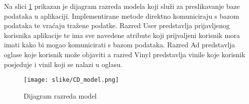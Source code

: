 			\eject
				
			Na slici \ref{fig:model} prikazan je dijagram razreda modela koji služi za preslikavanje baze podataka u aplikaciji. Implementirane metode direktno komuniciraju s bazom podataka te vraćaju tražene podatke. Razred User predstavlja prijavljenog korisnika aplikacije te ima sve navedene atribute koji prijvaljeni korisnik mora imati kako bi mogao komunicirati s bazom podataka. Razred Ad predstavlja oglase koje korisnik može objaviti a razred Vinyl predstavlja vinile koje korisnik posjeduje i vinil koji se nalazi u oglasu.
				
				\begin{figure}[H]
					\texttt{[image: slike/CD\_model.png]}
					\centering
					\caption{Dijagram razreda model}
					\label{fig:model}
				\end{figure}

			
%			
			
			
			
			\eject
		
%			
%			
%			
%			
%			
%		
%			
%			
%			
%		
%		
